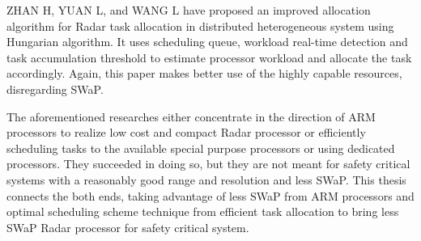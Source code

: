 ZHAN H, YUAN L, and WANG L \cite{RTschedParallel} have proposed an improved allocation algorithm for Radar task allocation in distributed heterogeneous system using Hungarian algorithm. It uses scheduling queue, workload real-time detection and task accumulation threshold to estimate processor workload and allocate the task accordingly. Again, this paper makes better use of the highly capable resources, disregarding SWaP.

The aforementioned researches either concentrate in the direction of ARM processors to realize low cost and compact Radar processor or efficiently scheduling tasks to the available special purpose processors or using dedicated processors. They succeeded in doing so, but they are not meant for safety critical systems with a reasonably good range and resolution and less SWaP. This thesis connects the both ends, taking advantage of less SWaP from ARM processors and optimal scheduling scheme technique from efficient task allocation to bring less SWaP Radar processor for safety critical system.

